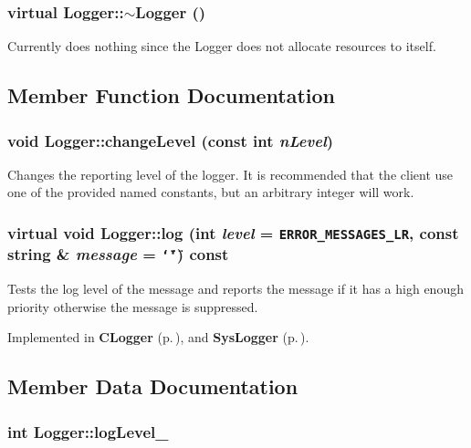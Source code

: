 \subsubsection{\setlength{\rightskip}{0pt plus 5cm}virtual Logger::$\sim$Logger ()\hspace{0.3cm}{\tt  [inline, virtual]}}\label{classLogger_a1}


Currently does nothing since the Logger does not allocate resources to itself.

\subsection{Member Function Documentation}
\subsubsection{\setlength{\rightskip}{0pt plus 5cm}void Logger::change\-Level (const int {\em n\-Level})\hspace{0.3cm}{\tt  [inline]}}\label{classLogger_a3}


Changes the reporting level of the logger. It is recommended that the client use one of the provided named constants, but an arbitrary integer will work.
\subsubsection{\setlength{\rightskip}{0pt plus 5cm}virtual void Logger::log (int {\em level} = {\tt ERROR\_\-MESSAGES\_\-LR}, const string \& {\em message} = {\tt \char`\"{}\char`\"{}}) const\hspace{0.3cm}{\tt  [pure virtual]}}\label{classLogger_a2}


Tests the log level of the message and reports the message if it has a high enough priority otherwise the message is suppressed.

Implemented in {\bf CLogger} {\rm (p.\,\pageref{classCLogger_a2})}, and {\bf Sys\-Logger} {\rm (p.\,\pageref{classSysLogger_a2})}.

\subsection{Member Data Documentation}
\subsubsection{\setlength{\rightskip}{0pt plus 5cm}int {\bf Logger::log\-Level\_\-}\hspace{0.3cm}{\tt  [protected]}}\label{classLogger_p0}


